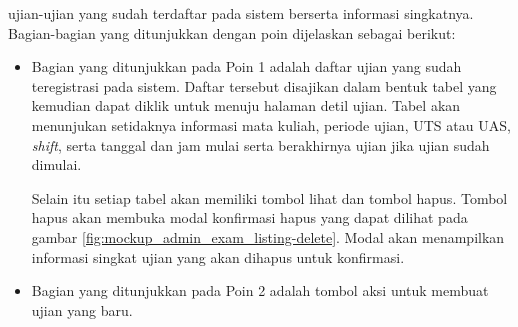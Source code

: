     ujian-ujian yang sudah terdaftar pada sistem berserta informasi singkatnya.
    Bagian-bagian yang ditunjukkan dengan poin dijelaskan sebagai berikut:
    \begin{itemize}
        \item Bagian yang ditunjukkan pada Poin 1 adalah daftar ujian yang sudah
            teregistrasi pada sistem. Daftar tersebut disajikan dalam bentuk
            tabel yang kemudian dapat diklik untuk menuju halaman detil
            ujian. Tabel akan menunjukan setidaknya informasi mata kuliah,
            periode ujian, UTS atau UAS, \textit{shift}, serta tanggal dan jam
            mulai serta berakhirnya ujian jika ujian sudah dimulai.
            
            Selain itu setiap tabel akan memiliki tombol lihat dan tombol hapus. Tombol
            hapus akan membuka modal konfirmasi hapus yang dapat dilihat pada gambar
            \ref{fig:mockup_admin_exam_listing-delete}. Modal akan menampilkan informasi
            singkat ujian yang akan dihapus untuk konfirmasi. 
        
        \item Bagian yang ditunjukkan pada Poin 2 adalah tombol aksi untuk
            membuat ujian yang baru.
    \end{itemize}
    

